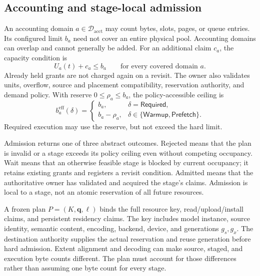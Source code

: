 \subsection{Accounting and stage-local admission}
An accounting domain $a\in\mathcal D_{\mathrm{acct}}$ may count bytes, slots,
pages, or queue entries. Its configured limit $b_a$ need not cover an entire
physical pool. Accounting domains can overlap and cannot generally be added.
For an additional claim $c_a$, the capacity condition is
\begin{equation}
 U_a(t)+c_a\leq b_a\qquad\text{for every covered domain }a.
 \label{eq:admission}
\end{equation}
Already held grants are not charged again on a revisit. The owner also
validates units, overflow, source and placement compatibility, reservation
authority, and demand policy. With reserve $0\leq\rho_a\leq b_a$, the
policy-accessible ceiling is
\begin{equation}
 b_a^{\mathrm{eff}}(\delta)=
 \begin{cases}
 b_a,&\delta=\mathsf{Required},\\
 b_a-\rho_a,&\delta\in\{\mathsf{Warmup},\mathsf{Prefetch}\}.
 \end{cases}
 \label{eq:execution-reserve}
\end{equation}
Required execution may use the reserve, but not exceed the hard limit.

Admission returns one of three abstract outcomes. \textsf{Rejected} means
that the plan is invalid or a stage exceeds its policy ceiling even without
competing occupancy. \textsf{Wait} means that an otherwise feasible stage is
blocked by current occupancy; it retains existing grants and registers a
revisit condition. \textsf{Admitted} means that the authoritative owner has
validated and acquired the stage's claims. Admission is local to a stage,
not an atomic reservation of all future resources.

A frozen plan $P=(K,\boldsymbol q,\boldsymbol\ell)$ binds the full resource
key, read/upload/install claims, and persistent residency claims. The key
includes model instance, source identity, semantic content, encoding, backend,
device, and generations $g_s,g_x$. The destination authority supplies the
actual reservation and reuse generation before hard admission. Extent
alignment and decoding can make source, staged, and execution byte counts
different. The plan must account for those differences rather than assuming
one byte count for every stage.

